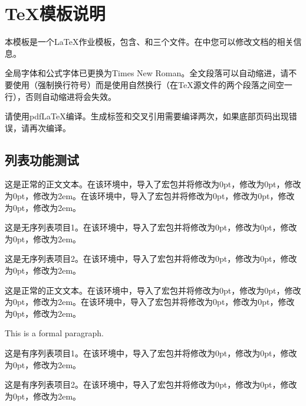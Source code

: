 \documentclass{article}
\begin{document}
\maketitle
\tableofcontents
\section{\TeX 模板说明}
本模板是一个\LaTeX 作业模板，包含、和三个文件。在中您可以修改文档的相关信息。

全局字体和公式字体已更换为Times New Roman。全文段落可以自动缩进，请不要使用\code{\\\\}（强制换行符号）而是使用自然换行（在\TeX 源文件的两个段落之间空一行），否则自动缩进将会失效。

请使用pdf\LaTeX 编译。生成标签和交叉引用需要编译两次，如果底部页码出现错误，请再次编译。
\subsection{列表功能测试}
这是正常的正文文本。在该环境中，导入了宏包并将修改为0pt，修改为0pt，修改为0pt，修改为2em。在该环境中，导入了宏包并将修改为0pt，修改为0pt，修改为0pt，修改为2em。
\begin{itemlist}
    \item 这是无序列表项目1。在该环境中，导入了宏包并将修改为0pt，修改为0pt，修改为0pt，修改为2em。
    \item 这是无序列表项目2。在该环境中，导入了宏包并将修改为0pt，修改为0pt，修改为0pt，修改为2em。
\end{itemlist}

这是正常的正文文本。在该环境中，导入了宏包并将修改为0pt，修改为0pt，修改为0pt，修改为2em。在该环境中，导入了宏包并将修改为0pt，修改为0pt，修改为0pt，修改为2em。

This is a formal paragraph.
\begin{numlist}
    \item 这是有序列表项目1。在该环境中，导入了宏包并将修改为0pt，修改为0pt，修改为0pt，修改为2em。
    \item 这是有序列表项目2。在该环境中，导入了宏包并将修改为0pt，修改为0pt，修改为0pt，修改为2em。
\end{numlist}
\end{document}
